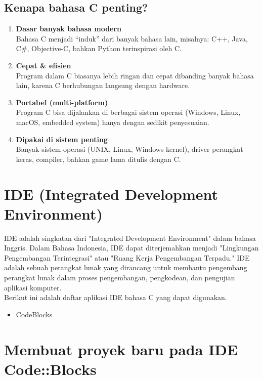 \subsection*{Kenapa bahasa C penting?}
\begin{enumerate}
    \item \textbf{Dasar banyak bahasa modern} \\
    Bahasa C menjadi ``induk'' dari banyak bahasa lain, misalnya: C++, Java, C\#, Objective-C, bahkan Python terinspirasi oleh C.

    \item \textbf{Cepat \& efisien} \\
    Program dalam C biasanya lebih ringan dan cepat dibanding banyak bahasa lain, karena C berhubungan langsung dengan hardware.

    \item \textbf{Portabel (multi-platform)} \\
    Program C bisa dijalankan di berbagai sistem operasi (Windows, Linux, macOS, embedded system) hanya dengan sedikit penyesuaian.

    \item \textbf{Dipakai di sistem penting} \\
    Banyak sistem operasi (UNIX, Linux, Windows kernel), driver perangkat keras, compiler, bahkan game lama ditulis dengan C.
\end{enumerate}

\section*{IDE (Integrated Development Environment)}
IDE adalah singkatan dari "Integrated Development Environment" dalam bahasa Inggris.
Dalam Bahasa Indonesia, IDE dapat diterjemahkan menjadi "Lingkungan Pengembangan Terintegrasi" atau "Ruang Kerja Pengembangan Terpadu."
IDE adalah sebuah perangkat lunak yang dirancang untuk membantu pengembang perangkat lunak dalam proses pengembangan, pengkodean, dan pengujian aplikasi komputer.
\\
Berikut ini adalah daftar aplikasi IDE bahasa C yang dapat digunakan.
\begin{itemize}
	\item CodeBlocks
\end{itemize}
\section*{Membuat proyek baru pada IDE Code::Blocks}

